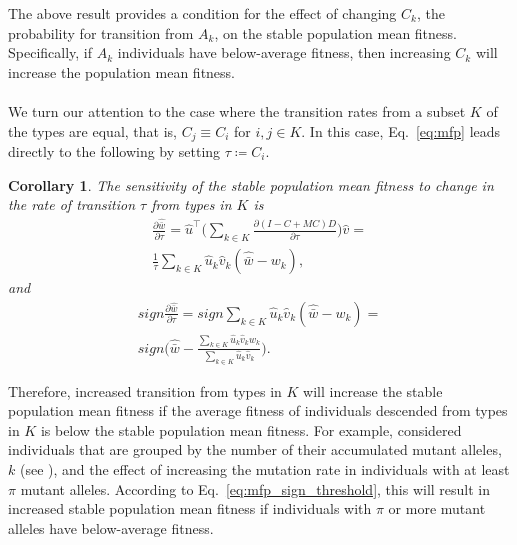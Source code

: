 \documentclass[12pt, twocolumn]{extarticle}
\newcommand*{\tr}{^\intercal}
\newtheorem{corollary}{Corollary}
\begin{document}
The above result provides a condition for the effect of changing $C_k$, the probability for transition from $A_k$, on the stable population mean fitness.
Specifically, if $A_k$ individuals have below-average fitness, then increasing $C_k$ will increase the population mean fitness.

\paragraph*{}
We turn our attention to the case where the transition rates from a subset $K$ of the types are equal, that is, $C_j \equiv C_i$ for $i,j \in K$.
In this case, Eq.~\ref{eq:mfp} leads directly to the following by setting $\tau \coloneqq C_i$.

\begin{corollary}
The sensitivity of the stable population mean fitness to change in the rate of transition $\tau$ from types in $K$ is
\begin{multline}\label{eq:mfp_K}
\frac{\partial \hat{\bar w}}{\partial \tau} = 
\hat u\tr \Big( \sum_{k \in K}{\frac{\partial (I - C + MC)D}{\partial \tau}} \Big) \hat v = \\
\frac{1}{\tau} \sum_{k \in K}{\hat u_k \hat v_k (\hat{\bar w} - w_k)},
\end{multline}
and
\begin{multline}\label{eq:mfp_sign_threshold}
sign \frac{\partial \hat{\bar w}}{\partial \tau} = 
sign \sum_{k \in K}{\hat u_k \hat v_k (\hat{\bar w} - w_k)} = \\ 
sign \Big(\hat{\bar w} - \frac{\sum_{k \in K}{\hat u_k \hat v_k w_k}}{\sum_{k \in K}{\hat u_k \hat v_k}}\Big).
\end{multline}
\end{corollary}

Therefore, increased transition from types in $K$ will increase the stable population mean fitness if the average fitness of individuals descended from types in $K$ is below the stable population mean fitness.
For example, \citet[Appendix~B]{Ram2012} considered individuals that are grouped by the number of their accumulated mutant alleles, $k$ (see ), 
and the effect of increasing the mutation rate in individuals with at least $\pi$ mutant alleles.
According to Eq.~\ref{eq:mfp_sign_threshold}, this will result in increased stable population mean fitness if individuals with $\pi$ or more mutant alleles have below-average fitness. 
\end{document}
